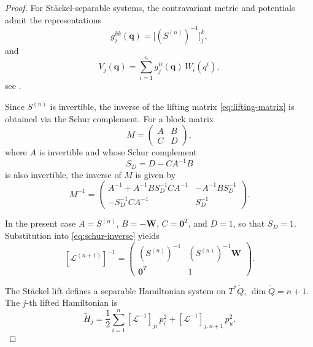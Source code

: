 \documentclass[10pt]{amsart}
\numberwithin{equation}{section}
\theoremstyle{definition}
\begin{document}
\begin{proof}
	For Stäckel-separable systems, the contravariant metric and potentials admit
	the representations
	\begin{equation}\label{eq:metric-stackel}
		g^{kk}_j(\boldsymbol{q})=\bigl[(S^{(n)})^{-1}\bigr]_{j}^{k},
	\end{equation}
	and
	\begin{equation}\label{eq:potential-stackel}
		V_j(\boldsymbol{q})=\sum_{i=1}^n g^{ii}_j(\boldsymbol{q})\, W_i(q^i),
	\end{equation}
	see \cite{Benenti1997}.
	
	Since $S^{(n)}$ is invertible, the inverse of the lifting matrix
	\eqref{eq:lifting-matrix} is obtained via the Schur complement.
	For a block matrix
	\begin{equation}\label{eq:block-matrix}
		M=\begin{pmatrix} A & B \\ C & D \end{pmatrix},
	\end{equation}
	where $A$ is invertible and whose Schur complement
	\begin{equation}\label{eq:schur-complement}
		S_D = D - C A^{-1} B
	\end{equation}
	is also invertible, the inverse of $M$ is given by
	\begin{equation}\label{eq:schur-inverse}
		M^{-1}
		=
		\begin{pmatrix}
			A^{-1} + A^{-1} B S_D^{-1} C A^{-1}
			& -A^{-1} B S_D^{-1} \\
			- S_D^{-1} C A^{-1}
			& S_D^{-1}
		\end{pmatrix}.
	\end{equation}
	
	In the present case $A=S^{(n)}$, $B=-\boldsymbol{W}$,
	$C=\boldsymbol{0}^T$, and $D=1$, so that $S_D=1$. Substitution into
	\eqref{eq:schur-inverse} yields
	\begin{equation}\label{eq:lifted-inverse}
		[\mathcal{L}^{(n+1)}]^{-1}
		=
		\begin{pmatrix}
			(S^{(n)})^{-1} & (S^{(n)})^{-1}\boldsymbol{W} \\
			\boldsymbol{0}^T & 1
		\end{pmatrix}.
	\end{equation}
	
	The Stäckel lift defines a separable Hamiltonian system on $T^*\tilde Q$,
	$\dim\tilde Q=n+1$. The $j$-th lifted Hamiltonian is
	\begin{equation}\label{eq:H-tilde-def}
		\tilde H_j
		= \frac{1}{2}\sum_{i=1}^n [\mathcal{L}^{-1}]_{ji}\, p_i^2
		+ [\mathcal{L}^{-1}]_{j,n+1}\, p_u^2 .
	\end{equation}
	

\end{proof}
\end{document}
